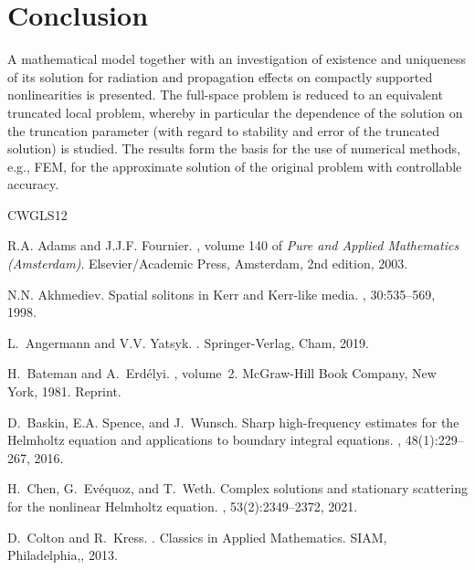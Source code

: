\documentclass[12pt,DIV=14]{scrartcl}
\renewenvironment{thebibliography}[1]{
\begin{oldthebibliography}{#1}
\setlength{\itemsep}{0em}
\setlength{\parskip}{0em}
}
{
\end{oldthebibliography}
}
\begin{document}
\section{Conclusion}
A mathematical model together with an investigation of existence
and uniqueness of its solution for radiation and propagation effects
on compactly supported nonlinearities is presented.
The full-space problem is reduced to an equivalent truncated local problem,
whereby in particular the dependence of the solution on the truncation parameter
(with regard to stability and error of the truncated solution) is studied.
The results form the basis for the use of numerical methods, e.g., FEM,
for the approximate solution of the original problem with controllable accuracy.

\begin{thebibliography}{CWGLS12}

R.A. Adams and J.J.F. Fournier.
, volume 140 of {\em Pure and Applied Mathematics
  (Amsterdam)}.
\newblock Elsevier/Academic Press, Amsterdam, 2nd edition, 2003.

N.N. Akhmediev.
\newblock Spatial solitons in {K}err and {K}err-like media.
, 30:535--569, 1998.

L.~Angermann and V.V. Yatsyk.
.
\newblock Springer-Verlag, Cham, 2019.

H.~Bateman and A.~Erd{\'e}lyi.
, volume~2.
\newblock McGraw-Hill Book Company, New York, 1981.
\newblock Reprint.

D.~Baskin, E.A. Spence, and J.~Wunsch.
\newblock Sharp high-frequency estimates for the {H}elmholtz equation and
  applications to boundary integral equations.
, 48(1):229--267, 2016.

H.~Chen, G.~Ev{\'{e}}quoz, and T.~Weth.
\newblock Complex solutions and stationary scattering for the nonlinear
  {H}elmholtz equation.
, 53(2):2349--2372, 2021.

D.~Colton and R.~Kress.
.
\newblock Classics in Applied Mathematics. SIAM, Philadelphia,, 2013.


\end{thebibliography}
\end{document}
